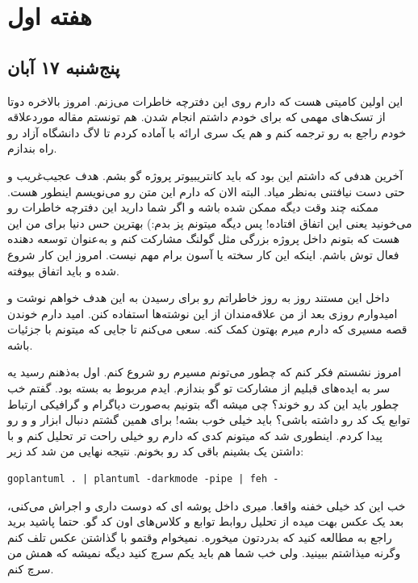 \section{هفته اول}

\subsection{پنج‌شنبه ۱۷ آبان}
این اولین کامیتی هست که دارم روی این دفترچه خاطرات می‌زنم. امروز بالاخره دوتا از تسک‌های مهمی که برای خودم داشتم انجام شدن.
هم تونستم مقاله موردعلاقه خودم راجع به  رو ترجمه کنم و هم یک سری ارائه با  آماده کردم تا لاگ دانشگاه آزاد رو راه بندازم.

آخرین هدفی که داشتم این بود که باید کانتریبیوتر پروژه گو بشم. هدف عجیب‌غریب و حتی دست نیافتنی به‌نظر میاد. البته الان که دارم این متن رو می‌نویسم
اینطور هست. ممکنه چند وقت دیگه ممکن شده باشه و اگر شما دارید این دفترچه خاطرات رو می‌خونید یعنی این اتفاق افتاده!
پس دیگه میتونم پز بدم:) بهترین حس دنیا برای من این هست که بتونم داخل پروژه بزرگی مثل گولنگ مشارکت کنم و به‌عنوان توسعه دهنده فعال توش باشم.
اینکه این کار سخته یا آسون برام مهم نیست. امروز این کار شروع شده و باید اتفاق بیوفته.

داخل این مستند روز به روز خاطراتم رو برای رسیدن به این هدف خواهم نوشت و امیدوارم روزی بعد از من علاقه‌مندان از این نوشته‌ها استفاده کنن.
امید دارم خوندن قصه مسیری که دارم میرم بهتون کمک کنه. سعی می‌کنم تا جایی که میتونم با جزئیات باشه.

امروز نشستم فکر کنم که چطور می‌تونم مسیرم رو شروع کنم. اول به‌ذهنم رسید یه سر به ایده‌های قبلیم از مشارکت تو گو بندازم.
ایدم مربوط به بسته  بود. گفتم خب چطور باید این کد رو خوند؟ چی میشه اگه بتونیم به‌صورت دیاگرام و گرافیکی ارتباط توابع یک کد رو داشته باشی؟
باید خیلی خوب بشه! برای همین گشتم دنبال ابزار و  و  رو پیدا کردم. اینطوری شد که میتونم کدی که دارم رو
خیلی راحت تر تحلیل کنم و با داشتن یک  بشینم باقی کد رو بخونم.
نتیجه نهایی من شد کد زیر:
\begin{latin}
\begin{verbatim}
goplantuml . | plantuml -darkmode -pipe | feh -
\end{verbatim}
\end{latin}

خب این کد خیلی خفنه واقعا. میری داخل پوشه ای که دوست داری و اجراش می‌کنی، بعد یک عکس بهت میده از تحلیل روابط توابع و کلاس‌های اون
کد گو. حتما پاشید برید راجع به  مطالعه کنید که بدردتون میخوره. نمیخوام وقتمو با گذاشتن عکس تلف کنم وگرنه میذاشتم ببینید.
ولی خب شما هم باید یکم سرچ کنید دیگه نمیشه که همش من سرچ کنم.

